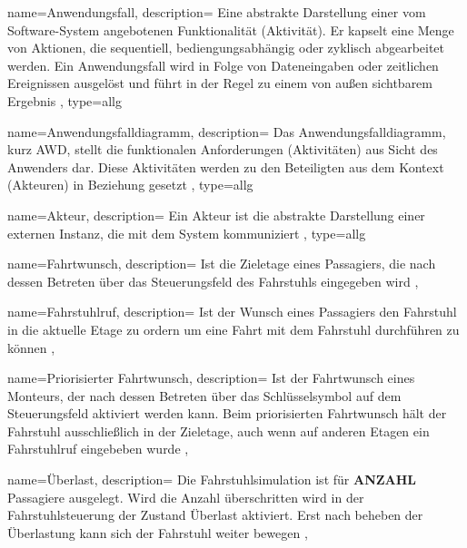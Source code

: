 

{
	name=Anwendungsfall,
	description={
		Eine abstrakte Darstellung einer vom Software-System angebotenen Funktionalität (Aktivität). Er kapselt eine Menge von Aktionen, die sequentiell, bediengungsabhängig oder zyklisch abgearbeitet werden. Ein Anwendungsfall wird in Folge von Dateneingaben oder zeitlichen Ereignissen ausgelöst und führt in der Regel zu einem von au{\ss}en sichtbarem Ergebnis
	},
	type=allg
}

{
	name=Anwendungsfalldiagramm,
	description={
		Das Anwendungsfalldiagramm, kurz AWD, stellt die funktionalen Anforderungen (Aktivitäten) aus Sicht des Anwenders dar. Diese Aktivitäten werden zu den Beteiligten aus dem Kontext (Akteuren) in Beziehung gesetzt
	},
	type=allg
}

{
	name=Akteur,
	description={
		Ein Akteur ist die abstrakte Darstellung einer externen Instanz, die mit dem System kommuniziert
	},
	type=allg
}

{
	name=Fahrtwunsch,
	description={
		Ist die Zieletage eines \gls{Passagier}s, die nach dessen Betreten über das \gls{Steuerungsfeld} des Fahrstuhls eingegeben wird
		},
}

{
	name=Fahrstuhlruf,
	description={
		Ist der Wunsch eines \gls{Passagier}s den Fahrstuhl in die aktuelle Etage zu ordern um eine Fahrt mit dem Fahrstuhl durchführen zu können
	},
}

{
	name=Priorisierter Fahrtwunsch,
	description={
		Ist der \gls{Fahrtwunsch} eines \gls{Monteur}s, der nach dessen Betreten über das Schlüsselsymbol auf dem \gls{Steuerungsfeld} aktiviert werden kann. Beim priorisierten Fahrtwunsch hält der Fahrstuhl ausschließlich in der Zieletage, auch wenn auf anderen Etagen ein \gls{Fahrstuhlruf} eingebeben wurde
	},
}

{
	name=Überlast,
	description={
		Die \gls{Fahrstuhlsimulation} ist für \textbf{ANZAHL} \gls{Passagier}e ausgelegt. Wird die Anzahl überschritten wird in der \gls{Fahrstuhlsteuerung} der Zustand Überlast aktiviert. Erst nach beheben der Überlastung kann sich der Fahrstuhl weiter bewegen
	},
}

